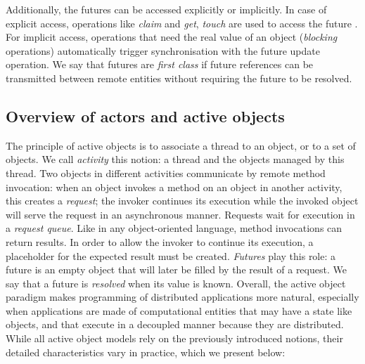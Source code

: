 Additionally, the futures can be accessed explicitly or implicitly. In
case of explicit access, operations like \emph{claim} and \emph{get},
\emph{touch} are used to access the future \cite{Elinar2006,ABCL1994}.
For implicit access, operations that need the real value of an object
(\emph{blocking} operations) automatically trigger synchronisation
with the future update operation. We say that futures are \emph{first
	class} if future references can be transmitted between remote
entities without requiring the future to be resolved.




\subsection{Overview of actors and active objects}\label{overview}
The principle of active objects is to associate a thread to an object, or to a set of
objects. We call \emph{activity} this notion: a thread and the objects
managed by this thread.  Two objects in different activities 
communicate by remote method invocation: when an object invokes a
method on an object in another activity, this creates a
\emph{request}; the invoker continues its execution while the invoked
object will serve the request in an asynchronous manner. Requests wait for execution in a \emph{request queue}. Like in any
object-oriented language, method invocations can return results. In
order to allow the invoker to continue its execution, a placeholder
for the expected result must be created. \emph{Futures} play this
role: a future is an empty object that will later be filled by the
result of a request. We say that a future is \emph{resolved} when its
value is known.
 Overall, the active object paradigm makes programming of distributed
 applications more natural, especially when applications are made of
computational entities that may have a state like objects, and that
execute in a decoupled manner because they are distributed.
While all active object models rely on the previously introduced notions, their
detailed characteristics vary in practice, which we present below:

